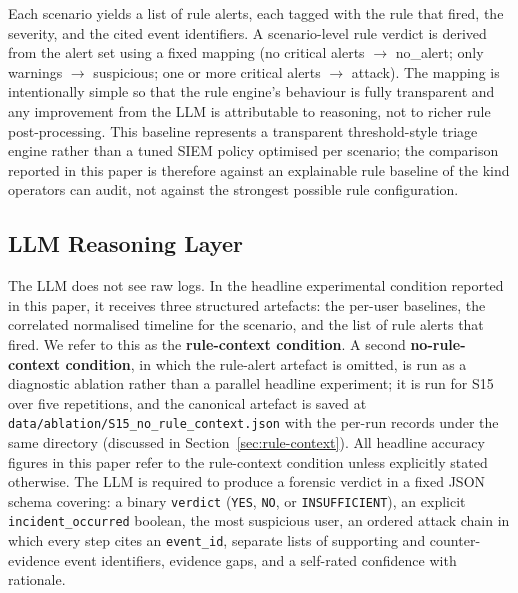 \documentclass[conference]{IEEEtran}
\begin{document}
Each scenario yields a list of rule alerts, each tagged with the rule that fired, the severity, and the cited event identifiers. A scenario-level rule verdict is derived from the alert set using a fixed mapping (no critical alerts $\rightarrow$ no\_alert; only warnings $\rightarrow$ suspicious; one or more critical alerts $\rightarrow$ attack). The mapping is intentionally simple so that the rule engine's behaviour is fully transparent and any improvement from the LLM is attributable to reasoning, not to richer rule post-processing. This baseline represents a transparent threshold-style triage engine rather than a tuned SIEM policy optimised per scenario; the comparison reported in this paper is therefore against an explainable rule baseline of the kind operators can audit, not against the strongest possible rule configuration.

\subsection{LLM Reasoning Layer}
\label{sec:llm}

The LLM does not see raw logs. In the headline experimental condition reported in this paper, it receives three structured artefacts: the per-user baselines, the correlated normalised timeline for the scenario, and the list of rule alerts that fired. We refer to this as the \textbf{rule-context condition}. A second \textbf{no-rule-context condition}, in which the rule-alert artefact is omitted, is run as a diagnostic ablation rather than a parallel headline experiment; it is run for S15 over five repetitions, and the canonical artefact is saved at \texttt{data/ablation/S15\_no\_rule\_context.json} with the per-run records under the same directory (discussed in Section~\ref{sec:rule-context}). All headline accuracy figures in this paper refer to the rule-context condition unless explicitly stated otherwise. The LLM is required to produce a forensic verdict in a fixed JSON schema covering: a binary \texttt{verdict} (\texttt{YES}, \texttt{NO}, or \texttt{INSUFFICIENT}), an explicit \texttt{incident\_occurred} boolean, the most suspicious user, an ordered attack chain in which every step cites an \texttt{event\_id}, separate lists of supporting and counter-evidence event identifiers, evidence gaps, and a self-rated confidence with rationale.
\end{document}
